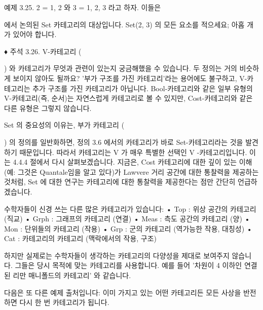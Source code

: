\documentclass[11pt, a4paper, twoside, openany]{book}
\begin{document}
{\par\medskip
예제 3.25.
2 = {1, 2} 와 3 = {1, 2, 3} 라고 하자. 이들은 
\begin{definitionbox}[정의 3.24]
에서 논의된 Set 카테고리의 대상입니다. Set(2, 3) 의 모든 요소를 적으세요; 아홉 개가 있어야 합니다.
\end{definitionbox}

\par\medskip
♦
주석 3.26. V-카테고리 (
\begin{definitionbox}[정의 2.46]
) 와 카테고리가 무엇과 관련이 있는지 궁금해했을 수 있습니다. 두 정의는 거의 비슷하게 보이지 않아도 될까요? '부가 구조를 가진 카테고리'라는 용어에도 불구하고, V-카테고리는 추가 구조를 가진 카테고리가 아닙니다. Bool-카테고리와 같은 일부 유형의 V-카테고리(즉, 순서)는 자연스럽게 카테고리로 볼 수 있지만, Cost-카테고리와 같은 다른 유형은 그렇지 않습니다.
\end{definitionbox}

\par\medskip
Set 의 중요성의 이유는, 부가 카테고리 (
\begin{definitionbox}[정의 2.46]
) 의 정의를 일반화하면, 정의 3.6 에서의 카테고리가 바로 Set-카테고리라는 것을 발견하기 때문입니다. 따라서 카테고리는 V 가 매우 특별한 선택인 V -카테고리입니다. 이는 4.4.4 절에서 다시 살펴보겠습니다. 지금은, Cost 카테고리에 대한 깊이 있는 이해(예: 그것은 Quantale\hspace{0pt}임을 알고 있다)가 Lawvere 거리 공간에 대한 통찰력을 제공하는 것처럼, Set 에 대한 연구는 카테고리에 대한 통찰력을 제공한다는 점만 간단히 언급하겠습니다.
\end{definitionbox}

\par\medskip
수학자들이 신경 쓰는 다른 많은 카테고리가 있습니다:
• Top : 위상 공간의 카테고리 (직교)
• Grph : 그래프의 카테고리 (연결)
• Meas : 측도 공간의 카테고리 (양)
• Mon : 단위들의 카테고리 (작용)
• Grp : 군의 카테고리 (역가능한 작용, 대칭성)
• Cat : 카테고리의 카테고리 (맥락에서의 작용, 구조)

\par\medskip
하지만 실제로는 수학자들이 생각하는 카테고리의 다양성을 제대로 보여주지 않습니다. 그들은 당시 목적에 맞는 카테고리를 사용합니다. 예를 들어 '차원이 4 이하인 연결된 리만 매니폴드의 카테고리' 와 같습니다.

\par\medskip
다음은 또 다른 예제 출처입니다: 이미 가지고 있는 어떤 카테고리든 모든 사상을 반전하면 다시 한 번 카테고리가 됩니다.

}
\end{document}
